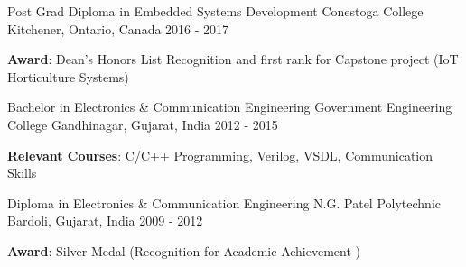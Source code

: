 

\begin{cventries}

  \cventry
    {Post Grad Diploma in Embedded Systems Development} %
    {Conestoga College} %
    {Kitchener, Ontario, Canada} %
    {2016 - 2017} %
    {
      \begin{cvitems} %
        \item {\textbf{Award}: Dean's Honors List Recognition and first rank for Capstone project (IoT Horticulture Systems)}
      \end{cvitems}
    }

  \cventry
    {Bachelor in Electronics \& Communication Engineering} %
    {Government Engineering College } %
    {Gandhinagar, Gujarat, India} %
    {2012 - 2015} %
    {
      \begin{cvitems} %
       \item {\textbf{Relevant Courses}: C/C++ Programming, Verilog, VSDL, Communication Skills }
      \end{cvitems}
    }

  \cventry
    {Diploma in Electronics \& Communication Engineering} %
    {N.G. Patel Polytechnic } %
    {Bardoli, Gujarat, India} %
    {2009 - 2012} %
    {
      \begin{cvitems} %
         \item {\textbf{Award}: Silver Medal (Recognition for Academic Achievement )}
      \end{cvitems}
    }

\end{cventries}
